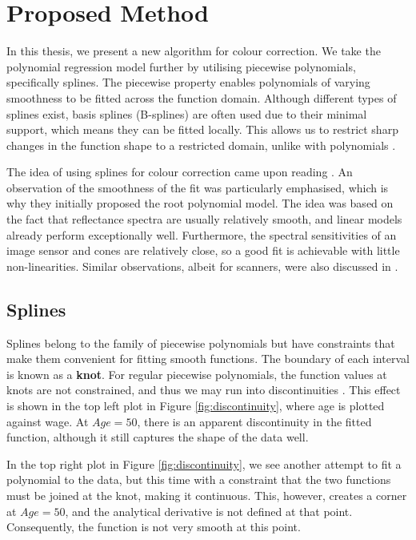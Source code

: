 \chapter{Proposed Method}
\label{ch:proposal}

In this thesis, we present a new algorithm for colour correction. We take the polynomial regression model further by utilising piecewise polynomials, specifically splines. The piecewise property enables polynomials of varying smoothness to be fitted across the function domain. Although different types of splines exist, basis splines (B-splines) are often used due to their minimal support, which means they can be fitted locally. This allows us to restrict sharp changes in the function shape to a restricted domain, unlike with polynomials \cite[140]{HastieTrevor2009EoSL}.

The idea of using splines for colour correction came upon reading \cite{finlayson2015color}. An observation of the smoothness of the fit was particularly emphasised, which is why they initially proposed the root polynomial model. The idea was based on the fact that reflectance spectra are usually relatively smooth, and linear models already perform exceptionally well. Furthermore, the spectral sensitivities of an image sensor and cones are relatively close, so a good fit is achievable with little non-linearities. Similar observations, albeit for scanners, were also discussed in \cite{wandell1993water}.

\section{Splines}

Splines belong to the family of piecewise polynomials but have constraints that make them convenient for fitting smooth functions. The boundary of each interval is known as a \textbf{knot}. For regular piecewise polynomials, the function values at knots are not constrained, and thus we may run into discontinuities \cite[141-144]{HastieTrevor2009EoSL}. This effect is shown in the top left plot in Figure \ref{fig:discontinuity}, where age is plotted against wage. At $Age=50$, there is an apparent discontinuity in the fitted function, although it still captures the shape of the data well.

In the top right plot in Figure \ref{fig:discontinuity}, we see another attempt to fit a polynomial to the data, but this time with a constraint that the two functions must be joined at the knot, making it continuous. This, however, creates a corner at $Age=50$, and the analytical derivative is not defined at that point. Consequently, the function is not very smooth at this point.

